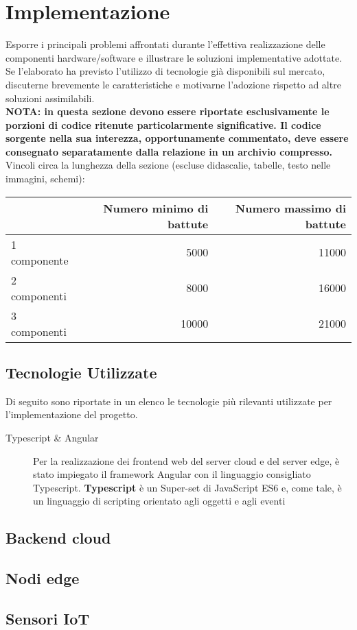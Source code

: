 \section{Implementazione}\label{sec:implementazione}

Esporre i principali problemi affrontati durante l'effettiva realizzazione delle componenti hardware/software e illustrare le soluzioni implementative adottate. Se l'elaborato ha previsto l'utilizzo di tecnologie già disponibili sul mercato, discuterne brevemente le caratteristiche e motivarne l'adozione rispetto ad altre soluzioni assimilabili.\\

\textbf{NOTA: in questa sezione devono essere riportate esclusivamente le porzioni di codice ritenute particolarmente significative. Il codice sorgente nella sua interezza, opportunamente commentato, deve essere consegnato separatamente dalla relazione in un archivio compresso.}\\


Vincoli circa la lunghezza della sezione (escluse didascalie, tabelle, testo nelle immagini, schemi):

\vspace{1cm}
\begin{tabular}{l|rr}
 & Numero minimo di battute & Numero massimo di battute \\
 \hline
 1 componente & 5000 & 11000 \\
 2 componenti & 8000 & 16000 \\
 3 componenti & 10000 & 21000 \\
 \hline
\end{tabular}

\subsection{Tecnologie Utilizzate}

Di seguito sono riportate in un elenco le tecnologie più rilevanti utilizzate per l'implementazione del progetto.

\begin{description}
  \item[Typescript \& Angular]
    Per la realizzazione dei frontend web del server cloud e del server edge, è stato impiegato il framework Angular con il linguaggio consigliato Typescript.
    \textbf{Typescript} è un Super-set di JavaScript ES6 e, come tale, è un linguaggio di scripting orientato agli oggetti e agli eventi
\end{description}

\subsection{Backend cloud}

\subsection{Nodi edge}

\subsection{Sensori IoT}
